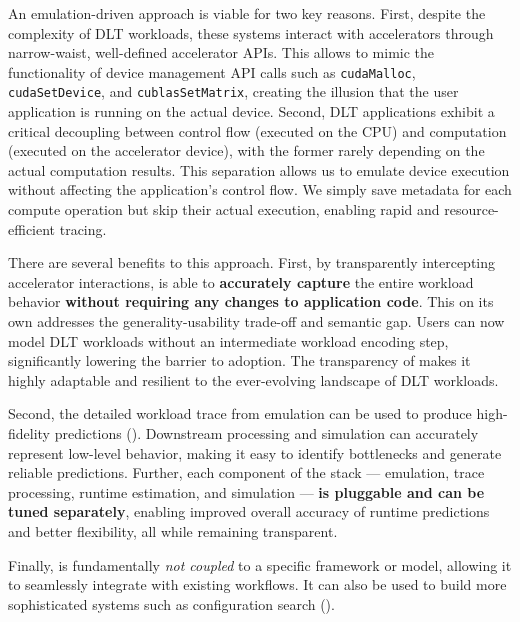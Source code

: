 An emulation-driven approach is viable for two key reasons. First, despite the complexity of DLT workloads, these systems interact with accelerators through narrow-waist, well-defined accelerator APIs. This allows \sysname to mimic the functionality of device management API calls such as \texttt{cudaMalloc}, \texttt{cudaSetDevice}, and \texttt{cublasSetMatrix}, creating the illusion that the user application is running on the actual device. Second, DLT applications exhibit a critical decoupling between control flow (executed on the CPU) and computation (executed on the accelerator device), with the former rarely depending on the actual computation results. This separation allows us to emulate device execution without affecting the application's control flow. We simply save metadata for each compute operation but skip their actual execution, enabling rapid and resource-efficient tracing.

There are several benefits to this approach. First, by transparently intercepting accelerator interactions, \sysname is able to \textbf{accurately capture} the entire workload behavior \textbf{without requiring any changes to application code}. This on its own addresses the generality-usability trade-off and semantic gap. Users can now model DLT workloads without an intermediate workload encoding step, significantly lowering the barrier to adoption. The transparency of \sysname makes it highly adaptable and resilient to the ever-evolving landscape of DLT workloads. 


Second, the detailed workload trace from emulation can be used to produce high-fidelity predictions (). Downstream processing and simulation can accurately represent low-level behavior, making it easy to identify bottlenecks and generate reliable predictions. Further, each component of the \sysname stack --- emulation, trace processing, runtime estimation, and simulation --- \textbf{is pluggable and can be tuned separately}, enabling improved overall accuracy of runtime predictions and better flexibility, all while remaining transparent.

Finally, \sysname is fundamentally \textit{not coupled} to a specific framework or model, allowing it to seamlessly integrate with existing workflows. It can also be used to build more sophisticated systems such as configuration search ().

